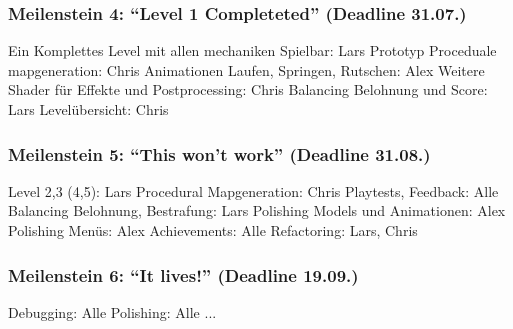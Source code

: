 \documentclass{article}
\begin{document}
\subsubsection{Meilenstein 4: “Level 1 Completeted” (Deadline 31.07.)}
Ein Komplettes Level mit allen mechaniken Spielbar: Lars\newline
Prototyp Proceduale mapgeneration: Chris\newline
Animationen Laufen, Springen, Rutschen: Alex\newline
Weitere Shader für Effekte und Postprocessing: Chris\newline
Balancing Belohnung und Score: Lars\newline
Levelübersicht: Chris\newline
\subsubsection{ Meilenstein 5: “This won’t work” (Deadline 31.08.)}
Level 2,3 (4,5): Lars\newline
Procedural Mapgeneration: Chris\newline
Playtests, Feedback: Alle\newline
Balancing Belohnung, Bestrafung: Lars\newline
Polishing Models und Animationen: Alex\newline
Polishing Menüs: Alex\newline
Achievements: Alle\newline
Refactoring: Lars, Chris\newline
\subsubsection{Meilenstein 6: “It lives!” (Deadline 19.09.)}
Debugging: Alle\newline
Polishing: Alle\newline
...\newline

	
\end{document}
